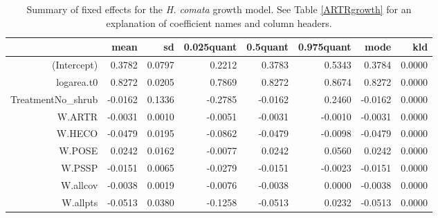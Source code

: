 \documentclass[11pt]{article}
\begin{document}
\begin{table}[ht]
\centering
\caption{Summary of fixed effects for the \textit{H. comata} growth model. See Table \ref{ARTRgrowth} for an explanation of coefficient names
and column headers.} 
\label{HECOgrowth}
\begin{tabular}{rrrrrrrr}
  \hline
 & mean & sd & 0.025quant & 0.5quant & 0.975quant & mode & kld \\ 
  \hline
(Intercept) & 0.3782 & 0.0797 & 0.2212 & 0.3783 & 0.5343 & 0.3784 & 0.0000 \\ 
  logarea.t0 & 0.8272 & 0.0205 & 0.7869 & 0.8272 & 0.8674 & 0.8272 & 0.0000 \\ 
  TreatmentNo\_shrub & -0.0162 & 0.1336 & -0.2785 & -0.0162 & 0.2460 & -0.0162 & 0.0000 \\ 
  W.ARTR & -0.0031 & 0.0010 & -0.0051 & -0.0031 & -0.0010 & -0.0031 & 0.0000 \\ 
  W.HECO & -0.0479 & 0.0195 & -0.0862 & -0.0479 & -0.0098 & -0.0479 & 0.0000 \\ 
  W.POSE & 0.0242 & 0.0162 & -0.0077 & 0.0242 & 0.0560 & 0.0242 & 0.0000 \\ 
  W.PSSP & -0.0151 & 0.0065 & -0.0279 & -0.0151 & -0.0023 & -0.0151 & 0.0000 \\ 
  W.allcov & -0.0038 & 0.0019 & -0.0076 & -0.0038 & 0.0000 & -0.0038 & 0.0000 \\ 
  W.allpts & -0.0513 & 0.0380 & -0.1258 & -0.0513 & 0.0232 & -0.0513 & 0.0000 \\ 
   \hline
\end{tabular}
\end{table}
\end{document}
